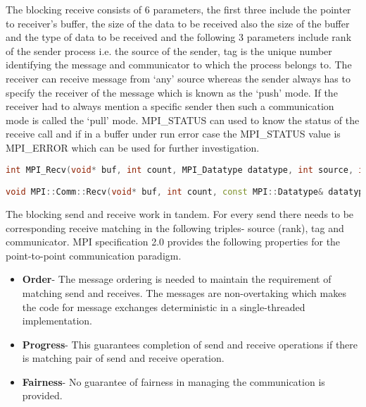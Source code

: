 The blocking receive consists of 6 parameters, the first three include the pointer to receiver's buffer, the size of the data to be received also the size of the buffer and the type of data to be received and the following 3 parameters include rank of the sender process i.e. the source of the sender, tag is the unique number identifying the message and communicator to which the process belongs to.  The receiver can receive message from {\lq}any{\rq} source whereas the sender always has to specify the receiver of the message which is known as the {\lq}push{\rq} mode. If the receiver had to always mention a specific sender then such a communication mode is called the {\lq}pull{\rq} mode. MPI\_STATUS can used to know the status of the receive call and if in a buffer under run error case the MPI\_STATUS value is MPI\_ERROR which can be used for further investigation. 

\begin{lstlisting}[language=C++,label={lst:mpiReceive},caption={Blocking MPI Receive}]
int MPI_Recv(void* buf, int count, MPI_Datatype datatype, int source, int tag, MPI_Comm comm, MPI_Status *status)

void MPI::Comm::Recv(void* buf, int count, const MPI::Datatype& datatype, int source, int tag, MPI::Status& status)
\end{lstlisting}

The blocking send and receive work in tandem. For every send there needs to be corresponding receive matching in the following triples- source (rank), tag and communicator. MPI specification 2.0 provides the following properties for the point-to-point communication paradigm. 

\begin{itemize}
\item \textbf{Order}- The message ordering is needed to maintain the requirement of matching send and receives. The messages are non-overtaking which makes the code for message exchanges deterministic in a single-threaded implementation. 
\item \textbf{Progress}- This guarantees completion of send and receive operations if there is matching pair of send and receive operation.  
\item \textbf{Fairness}- No guarantee of fairness in managing the communication is provided.  
\end{itemize} 


